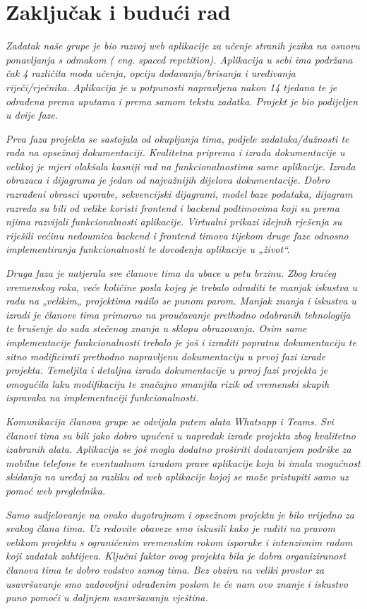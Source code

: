 \chapter{Zaključak i budući rad}
		
		 \textit{Zadatak naše grupe je bio razvoj web aplikacije za učenje stranih jezika na osnovu ponavljanja s odmakom ( eng. spaced repetition). Aplikacija u sebi ima podržana čak 4 različita moda učenja, opciju dodavanja/brisanja i uređivanja riječi/rječnika. Aplikacija je u potpunosti napravljena nakon 14 tjedana te je odrađena prema uputama i prema samom tekstu zadatka. Projekt je bio podijeljen u dvije faze.}
		
		 \textit{Prva faza projekta se sastojala od okupljanja tima, podjele zadataka/dužnosti te rada na opsežnoj dokumentaciji. Kvalitetna priprema i izrada dokumentacije u velikoj je mjeri olakšala kasniji rad na funkcionalnostima same aplikacije. Izrada obrazaca i dijagrama je jedan od najvažnijih dijelova dokumentacije. Dobro razrađeni obrasci uporabe, sekvencijski dijagrami, model baze podataka, dijagram razreda su bili od velike koristi frontend i backend podtimovima koji su prema njima razvijali funkcionalnosti aplikacije. Virtualni prikazi idejnih rješenja su riješili većinu nedoumica backend i frontend timova tijekom druge faze odnosno implementiranja funkcionalnosti te dovođenju aplikacije u „život“. }

		 \textit{Druga faza je natjerala sve članove tima da ubace u petu brzinu. Zbog kraćeg vremenskog roka, veće količine posla kojeg je trebalo odraditi te manjak iskustva u radu na „velikim„ projektima radilo se punom parom. Manjak znanja i iskustva u izradi je članove tima primorao na proučavanje prethodno odabranih tehnologija te brušenje do sada stečenog znanja u sklopu obrazovanja. Osim same implementacije funkcionalnosti trebalo je još i izraditi popratnu dokumentaciju te sitno modificirati prethodno napravljenu dokumentaciju u prvoj fazi izrade projekta. Temeljita i detaljna izrada dokumentacije u prvoj fazi projekta je omogućila laku modifikaciju te značajno smanjila rizik od vremenski skupih ispravaka na implementaciji funkcionalnosti.}

		 \textit{Komunikacija članova grupe se odvijala putem alata Whatsapp i Teams. Svi članovi tima su bili jako dobro upućeni u napredak izrade projekta zbog kvalitetno izabranih alata. Aplikacija se još mogla dodatno proširiti dodavanjem podrške za mobilne telefone te eventualnom izradom prave aplikacije koja bi imala mogućnost skidanja na uređaj za razliku od web aplikacije kojoj se može pristupiti samo uz pomoć web preglednika.}

		 \textit{Samo sudjelovanje na ovako dugotrajnom i opsežnom projektu je bilo vrijedno za svakog člana tima. Uz redovite obaveze smo iskusili kako je raditi na pravom velikom projektu s ograničenim vremenskim rokom isporuke i intenzivnim radom koji zadatak zahtijeva. Ključni faktor ovog projekta bila je dobra organiziranost članova tima te dobro vodstvo samog tima.  Bez obzira na veliki prostor za usavršavanje smo zadovoljni odrađenim poslom te će nam ovo znanje i iskustvo puno pomoći u daljnjem usavršavanju vještina. }
		
		\eject 